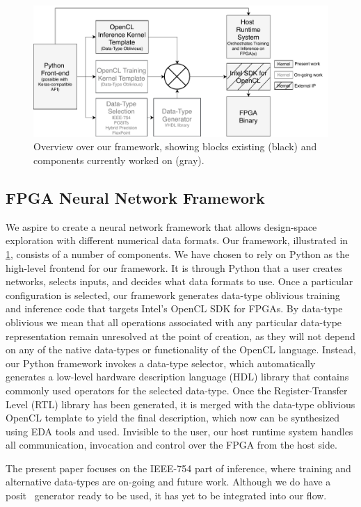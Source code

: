 \documentclass[techrep,english]{ipsj} %
\begin{document}
{\begin{figure}[p]
  \centering
  \includegraphics[width=0.7\linewidth]{training_overview.pdf}
  \caption{Overview over our framework, showing blocks existing (black) and components currently worked on (gray).}\label{fig:overview}
\end{figure}

\subsection{FPGA Neural Network Framework}
We aspire to create a neural network framework that allows design-space exploration with different numerical data formats.
Our framework, illustrated in \cref{fig:overview}, consists of a number of components.
We have chosen to rely on Python as the high-level frontend for our framework.
It is through Python that a user creates networks, selects inputs, and decides what data formats to use.
Once a particular configuration is selected, our framework generates data-type oblivious training and inference code that targets Intel's OpenCL SDK for FPGAs.
By data-type oblivious we mean that all operations associated with any particular data-type representation remain unresolved at the point of creation, as they will not depend on any of the native data-types or functionality of the OpenCL language.
Instead, our Python framework invokes a data-type selector, which automatically generates a low-level hardware description language (HDL) library that contains commonly used operators for the selected data-type.
Once the Register-Transfer Level (RTL) library has been generated, it is merged with the data-type oblivious OpenCL template to yield the final description, which now can be synthesized using EDA tools and used.
Invisible to the user, our host runtime system handles all communication, invocation and control over the FPGA from the host side.

The present paper focuses on the IEEE-754 part of inference, where training and alternative data-types are on-going and future work.
Although we do have a posit~\cite{podobasposit} generator ready to be used, it has yet to be integrated into our flow.

}
\end{document}
